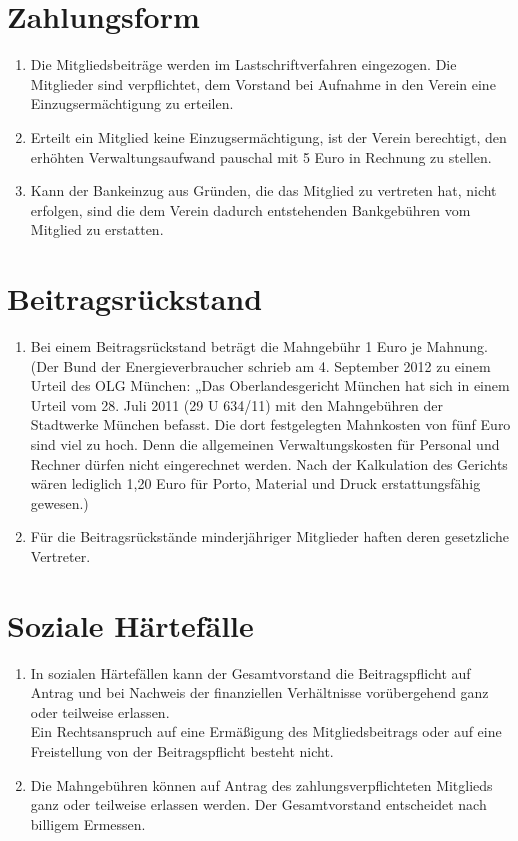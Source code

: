 \section{Zahlungsform}
\begin{enumerate}
  \item Die Mitgliedsbeiträge werden im Lastschriftverfahren eingezogen. Die Mitglieder sind verpflichtet, dem Vorstand bei Aufnahme in den Verein eine Einzugsermächtigung zu erteilen.
  \item Erteilt ein Mitglied keine Einzugsermächtigung, ist der Verein berechtigt, den erhöhten Verwaltungsaufwand pauschal mit 5 Euro in Rechnung zu stellen.
  \item Kann der Bankeinzug aus Gründen, die das Mitglied zu vertreten hat, nicht erfolgen, sind die dem Verein dadurch entstehenden Bankgebühren vom Mitglied zu erstatten.
\end{enumerate}

\section{Beitragsrückstand}
\begin{enumerate}
  \item Bei einem Beitragsrückstand beträgt die Mahngebühr 1 Euro je Mahnung. (Der Bund der Energieverbraucher schrieb am 4. September 2012 zu einem Urteil des OLG München: „Das Oberlandesgericht München hat sich in einem Urteil vom 28. Juli 2011 (29 U 634/11) mit den Mahngebühren der Stadtwerke München befasst. Die dort festgelegten Mahnkosten von fünf Euro sind viel zu hoch. Denn die allgemeinen Verwaltungskosten für Personal und Rechner dürfen nicht eingerechnet werden. Nach der Kalkulation des Gerichts wären lediglich 1,20 Euro für Porto, Material und Druck erstattungsfähig gewesen.)
  \item Für die Beitragsrückstände minderjähriger Mitglieder haften deren gesetzliche Vertreter.
\end{enumerate}

\section{Soziale Härtefälle}
\begin{enumerate}
  \item In sozialen Härtefällen kann der Gesamtvorstand die Beitragspflicht auf Antrag und bei Nachweis der finanziellen Verhältnisse vorübergehend ganz oder teilweise erlassen. \\
  Ein Rechtsanspruch auf eine Ermäßigung des Mitgliedsbeitrags oder auf eine Freistellung von der Beitragspflicht besteht nicht.
  \item Die Mahngebühren können auf Antrag des zahlungsverpflichteten Mitglieds ganz oder teilweise erlassen werden. Der Gesamtvorstand entscheidet nach billigem Ermessen.
\end{enumerate}


